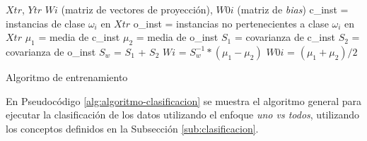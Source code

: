 \documentclass[journal]{IEEEtran}
\begin{document}


    

       

\begin{algorithm} 
\footnotesize
\begin{algorithmic}[1] 
\REQUIRE  $Xtr$, $Ytr$
\ENSURE $Wi$ (matriz de vectores de proyección), $W0i$ (matriz de \emph{bias})
\STATE c\_inst = instancias de clase $\omega_i$ en $Xtr$
\STATE o\_inst = instancias no pertenecientes a clase $\omega_i$ en $Xtr$
\STATE $\mu_1$ = media de c\_inst
\STATE $\mu_2$ = media de o\_inst
\STATE $S_1$ = covarianza de c\_inst
\STATE $S_2$ = covarianza de o\_inst
\STATE $S_w$ = $S_1$ + $S_2$
\STATE $Wi$ = $S_w^{-1}*(\mu_1 - \mu_2)$
\STATE $W0i$ = $(\mu_1 + \mu_2)/2$
\ENDFOR
\end{algorithmic} 
\caption{Algoritmo de entrenamiento} 
\label{alg:algoritmo-entrenamiento}
\end{algorithm}

En Pseudocódigo \ref{alg:algoritmo-clasificacion} se muestra el algoritmo general para ejecutar la clasificación de los datos utilizando el enfoque \emph{uno vs todos}, utilizando los conceptos definidos en la Subsección \ref{sub:clasificacion}.


\end{document}
